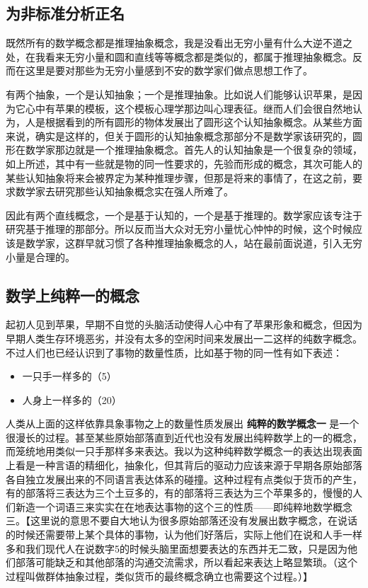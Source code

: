 \documentclass[12pt,oneside]{book}
\begin{document}
\subsection{为非标准分析正名}
既然所有的数学概念都是推理抽象概念，我是没看出无穷小量有什么大逆不道之处，在我看来无穷小量和圆和直线等等概念都是类似的，都属于推理抽象概念。反而在这里是要对那些为无穷小量感到不安的数学家们做点思想工作了。

有两个抽象，一个是认知抽象；一个是推理抽象。比如说人们能够认识苹果，是因为它心中有苹果的模板，这个模板心理学那边叫心理表征。继而人们会很自然地认为，人是根据看到的所有圆形的物体发展出了圆形这个认知抽象概念。从某些方面来说，确实是这样的，但关于圆形的认知抽象概念那部分不是数学家该研究的，圆形在数学家那边就是一个推理抽象概念。首先人的认知抽象是一个很复杂的领域，如上所述，其中有一些就是物的同一性要求的，先验而形成的概念，其次可能人的某些认知抽象将来会被界定为某种推理步骤，但那是将来的事情了，在这之前，要求数学家去研究那些认知抽象概念实在强人所难了。

因此有两个直线概念，一个是基于认知的，一个是基于推理的。数学家应该专注于研究基于推理的那部分。所以反而当大众对无穷小量忧心忡忡的时候，这个时候应该是数学家，这群早就习惯了各种推理抽象概念的人，站在最前面说道，引入无穷小量是合理的。


\subsection{数学上纯粹一的概念}
起初人见到苹果，早期不自觉的头脑活动使得人心中有了苹果形象和概念，但因为早期人类生存环境恶劣，并没有太多的空闲时间来发展出一二这样的纯数字概念。不过人们也已经认识到了事物的数量性质，比如基于物的同一性有如下表述：

\begin{itemize}
\item 一只手一样多的（5）
\item 人身上一样多的（20）
\end{itemize}

人类从上面的这样依靠具象事物之上的数量性质发展出 \textbf{纯粹的数学概念一} 是一个很漫长的过程。甚至某些原始部落直到近代也没有发展出纯粹数学上的一的概念，而笼统地用类似一只手那样多来表达。我以为这种纯粹数学概念一的表达出现表面上看是一种言语的精细化，抽象化，但其背后的驱动力应该来源于早期各原始部落各自独立发展出来的不同语言表达体系的碰撞。这种过程有点类似于货币的产生，有的部落将三表达为三个土豆多的，有的部落将三表达为三个苹果多的，慢慢的人们新造一个词语三来实实在在地表达事物的这个三的性质——即纯粹地数学概念三。【这里说的意思不要自大地认为很多原始部落还没有发展出数字概念，在说话的时候还需要带上某个具体的事物，认为他们好落后，实际上他们在说和人手一样多和我们现代人在说数字5的时候头脑里面想要表达的东西并无二致，只是因为他们部落可能缺乏和其他部落的沟通交流需求，所以看起来表达上略显繁琐。（这个过程叫做群体抽象过程，类似货币的最终概念确立也需要这个过程。）】
\end{document}
